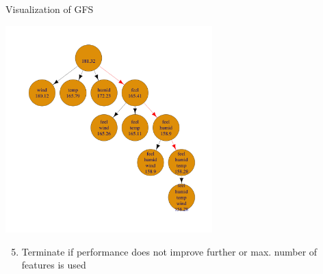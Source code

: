 \documentclass[11pt,compress,t,notes=noshow, xcolor=table]{beamer}
\begin{document}
\begin{frame}[noframenumbering]{Visualization of GFS}
    \begin{center}
      \includegraphics[width = 0.6\textwidth]{sl/feature-selection/figure/fs-wrappers-powerset-tree-4.png}
      \end{center}
      \vspace{-0.2cm}
 \begin{enumerate}
     \setcounter{enumi}{4}
     \item Terminate if performance does not improve further or max. number of features is used
 \end{enumerate}
\end{frame}

\end{document}
